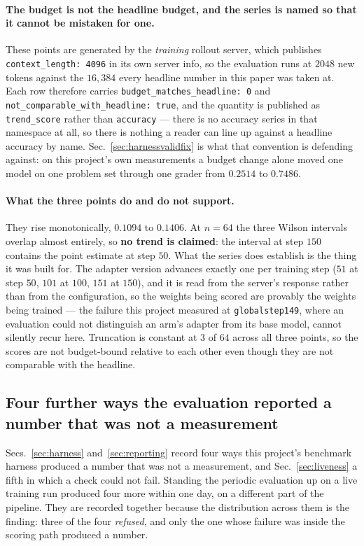 \paragraph{The budget is not the headline budget, and the series is named so that it cannot be
mistaken for one.} These points are generated by the \emph{training} rollout server, which
publishes \texttt{context\_length: 4096} in its own server info, so the evaluation runs at
$2048$ new tokens against the $16{,}384$ every headline number in this paper was taken at.
Each row therefore carries \texttt{budget\_matches\_headline: 0} and
\texttt{not\_comparable\_with\_headline: true}, and the quantity is published as
\texttt{trend\_score} rather than \texttt{accuracy} --- there is no accuracy series in that
namespace at all, so there is nothing a reader can line up against a headline accuracy by
name. Sec.~\ref{sec:harnessvalidfix} is what that convention is defending against: on this
project's own measurements a budget change alone moved one model on one problem set through
one grader from $0.2514$ to $0.7486$.

\paragraph{What the three points do and do not support.} They rise monotonically, $0.1094$ to
$0.1406$. At $n=64$ the three Wilson intervals overlap almost entirely, so \textbf{no trend is
claimed}: the interval at step $150$ contains the point estimate at step $50$. What the series
does establish is the thing it was built for. The adapter version advances exactly one per
training step ($51$ at step $50$, $101$ at $100$, $151$ at $150$), and it is read from the
server's response rather than from the configuration, so the weights being scored are provably
the weights being trained --- the failure this project measured at
\texttt{globalstep149}, where an evaluation could not distinguish an arm's adapter from its
base model, cannot silently recur here. Truncation is constant at $3$ of $64$ across all
three points, so the scores are not budget-bound relative to each other even though they are
not comparable with the headline.

\subsection{Four further ways the evaluation reported a number that was not a measurement}
\label{sec:evalfailures}

Secs.~\ref{sec:harness} and~\ref{sec:reporting} record four ways this project's benchmark
harness produced a number that was not a measurement, and Sec.~\ref{sec:liveness} a fifth in
which a check could not fail. Standing the periodic evaluation up on a live training run
produced four more within one day, on a different part of the pipeline. They are recorded
together because the distribution across them is the finding: three of the four
\emph{refused}, and only the one whose failure was inside the scoring path produced a number.

